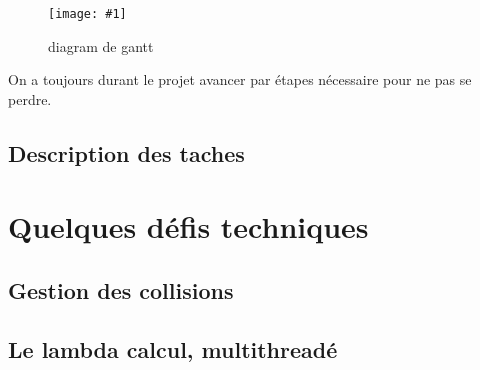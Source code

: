 \documentclass[french,12pt]{article}
\newcommand{\monimage}[4]{
\par\noindent
\begin{figure}[p] %
\begin{center}
\texttt{[image: \#1]} %
\caption{#2} %
\label{#3} %
\end{center}
\end{figure} %
}
\begin{document}
\monimage{gantt.png}{diagram de gantt}{dg}{1}

On a toujours durant le projet avancer par étapes nécessaire pour ne pas se perdre.



\subsection{Description des taches}



\section{Quelques défis techniques}


\subsection{Gestion des collisions}


\subsection{Le lambda calcul, multithreadé}


\newpage
\listoffigures
\newpage
\end{document}
